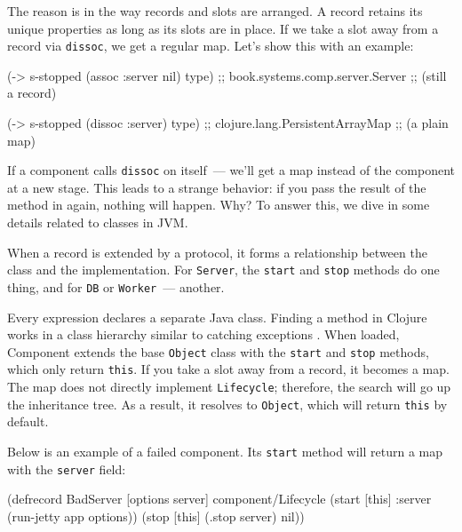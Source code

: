 \fi

The reason is in the way records and slots are arranged. A record retains its unique properties as long as its slots are in place. If we take a slot away from a record via \verb|dissoc|, we get a regular map. Let's show this with an example:

\begin{english}
  \begin{clojure}
(-> s-stopped
    (assoc :server nil)
    type)
;; book.systems.comp.server.Server
;; (still a record)

(-> s-stopped
    (dissoc :server)
    type)
;; clojure.lang.PersistentArrayMap
;; (a plain map)
  \end{clojure}
\end{english}

If a component calls \verb|dissoc| on itself~--- we'll get a map instead of the component at a new stage. This leads to a strange behavior: if you pass the result of the  method in  again, nothing will happen. Why? To answer this, we dive in some details related to classes in JVM.

When a record is extended by a protocol, it forms a relationship between the class and the implementation. For \verb|Server|, the \verb|start| and \verb|stop| methods do one thing, and for \verb|DB| or \verb|Worker|~--- another.

Every  expression declares a separate Java class. Finding a method in Clojure works in a class hierarchy similar to catching exceptions . When loaded, Component extends the base \verb|Object| class with the \verb|start| and \verb|stop| methods, which only return \verb|this|. If you take a slot away from a record, it becomes a map. The map does not directly implement \verb|Lifecycle|; therefore, the search will go up the inheritance tree. As a result, it resolves to \verb|Object|, which will return \verb|this| by default.

Below is an example of a failed component. Its \verb|start| method will return a map with the \verb|server| field:

\begin{english}
  \begin{clojure}
(defrecord BadServer [options server]
  component/Lifecycle
  (start [this]
    {:server (run-jetty app options)})
  (stop [this]
    (.stop server)
    nil))
  \end{clojure}
\end{english}

